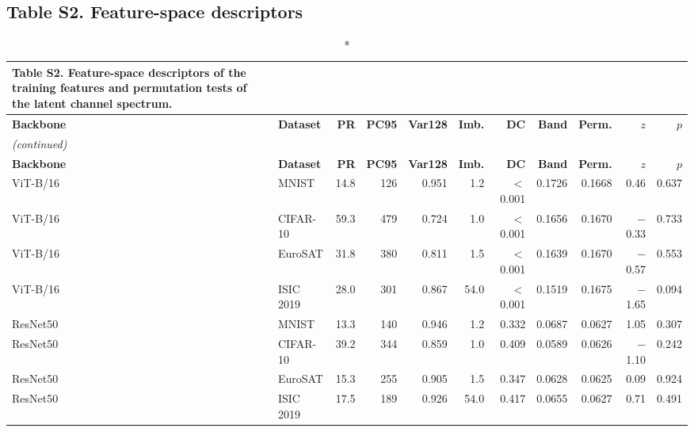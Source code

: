 \documentclass[10pt]{article}
\begin{document}
\subsection*{Table S2. Feature-space descriptors}
\footnotesize
\setlength{\tabcolsep}{3pt}
\begin{longtable}{llrrrrrrrrr}
\caption*{\textbf{Table S2.} Feature-space descriptors of the training features and permutation tests of the latent channel spectrum.}\\
\toprule
\textbf{Backbone} & \textbf{Dataset} & \textbf{PR} & \textbf{PC95} & \textbf{Var128} & \textbf{Imb.} & \textbf{DC} & \textbf{Band} & \textbf{Perm.} & \textbf{$z$} & \textbf{$p$} \\
\midrule
\endfirsthead
\multicolumn{11}{l}{\textit{(continued)}}\\
\toprule
\textbf{Backbone} & \textbf{Dataset} & \textbf{PR} & \textbf{PC95} & \textbf{Var128} & \textbf{Imb.} & \textbf{DC} & \textbf{Band} & \textbf{Perm.} & \textbf{$z$} & \textbf{$p$} \\
\midrule
\endhead
\bottomrule
\endfoot
ViT-B/16 & MNIST & 14.8 & 126 & 0.951 & 1.2 & $<$0.001 & 0.1726 & 0.1668 & 0.46 & 0.637 \\
ViT-B/16 & CIFAR-10 & 59.3 & 479 & 0.724 & 1.0 & $<$0.001 & 0.1656 & 0.1670 & $-$0.33 & 0.733 \\
ViT-B/16 & EuroSAT & 31.8 & 380 & 0.811 & 1.5 & $<$0.001 & 0.1639 & 0.1670 & $-$0.57 & 0.553 \\
ViT-B/16 & ISIC 2019 & 28.0 & 301 & 0.867 & 54.0 & $<$0.001 & 0.1519 & 0.1675 & $-$1.65 & 0.094 \\
\midrule
ResNet50 & MNIST & 13.3 & 140 & 0.946 & 1.2 & 0.332 & 0.0687 & 0.0627 & 1.05 & 0.307 \\
ResNet50 & CIFAR-10 & 39.2 & 344 & 0.859 & 1.0 & 0.409 & 0.0589 & 0.0626 & $-$1.10 & 0.242 \\
ResNet50 & EuroSAT & 15.3 & 255 & 0.905 & 1.5 & 0.347 & 0.0628 & 0.0625 & 0.09 & 0.924 \\
ResNet50 & ISIC 2019 & 17.5 & 189 & 0.926 & 54.0 & 0.417 & 0.0655 & 0.0627 & 0.71 & 0.491 \\
\end{longtable}
\normalsize
\end{document}
